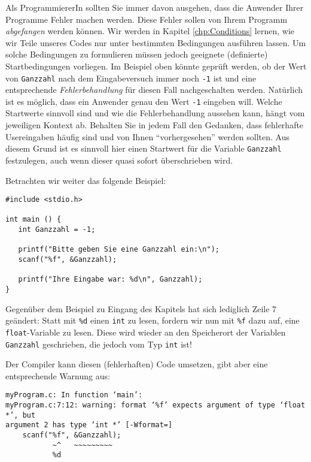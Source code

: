 \begin{hintbox}
Als ProgrammiererIn sollten Sie immer davon ausgehen, dass die Anwender Ihrer Programme Fehler machen werden. Diese Fehler sollen von Ihrem Programm \emph{abgefangen} werden können. Wir werden in Kapitel \ref{chp:Conditions} lernen, wie wir Teile unseres Codes nur unter bestimmten Bedingungen ausführen lassen. Um solche Bedingungen zu formulieren müssen jedoch geeignete (definierte) Startbedingungen vorliegen. Im Beispiel oben könnte geprüft werden, ob der Wert von \texttt{Ganzzahl} nach dem Eingabeversuch immer noch \texttt{-1} ist und eine entsprechende \emph{Fehlerbehandlung} für diesen Fall nachgeschalten werden. Natürlich ist es möglich, dass ein Anwender genau den Wert \texttt{-1} eingeben will. Welche Startwerte sinnvoll sind und wie die Fehlerbehandlung aussehen kann, hängt vom jeweiligen Kontext ab. Behalten Sie in jedem Fall den Gedanken, dass fehlerhafte Usereingaben häufig sind und von Ihnen \enquote{vorhergesehen} werden sollten. Aus diesem Grund ist es sinnvoll hier einen Startwert für die Variable \texttt{Ganzzahl} festzulegen, auch wenn dieser quasi sofort überschrieben wird.
\end{hintbox}

Betrachten wir weiter das folgende Beispiel:

\begin{warnbox}[Beispiel: Fehler bei \texttt{scanf}: Falsche Typisierung, leftupper=7mm]
\begin{verbatim}
#include <stdio.h>

int main () {
   int Ganzzahl = -1;

   printf("Bitte geben Sie eine Ganzzahl ein:\n");
   scanf("%f", &Ganzzahl);

   printf("Ihre Eingabe war: %d\n", Ganzzahl);
}
\end{verbatim}
\end{warnbox}

Gegenüber dem Beispiel zu Eingang des Kapitels hat sich lediglich Zeile 7 geändert: Statt mit \texttt{\%d} einen \texttt{int} zu lesen, fordern wir nun mit \texttt{\%f} dazu auf, eine \texttt{float}-Variable zu lesen. Diese wird wieder an den Speicherort der Variablen \texttt{Ganzzahl} geschrieben, die jedoch vom Typ \texttt{int} ist!

Der Compiler kann diesen (fehlerhaften) Code umsetzen, gibt aber eine entsprechende Warnung aus:

\begin{cmdbox}
\begin{verbatim}
myProgram.c: In function ‘main’:
myProgram.c:7:12: warning: format ‘%f’ expects argument of type ‘float *’, but
argument 2 has type ‘int *’ [-Wformat=]
    scanf("%f", &Ganzzahl);
           ~^   ~~~~~~~~~
           %d
\end{verbatim}
\end{cmdbox}

